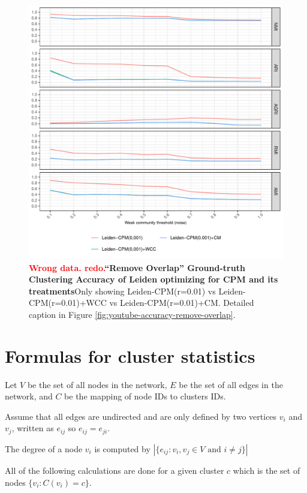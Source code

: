 \documentclass[aps,pre,superscriptaddress]{revtex4}
\begin{document}
\begin{figure}[!htpb]
\centering
\includegraphics[]{figures/remove_overlap_youtube_leiden_cpm_accuracy.pdf}
\caption[]{\textbf{\textcolor{red}{Wrong data. redo.}``Remove Overlap'' Ground-truth Clustering Accuracy of Leiden optimizing for CPM and its treatments}Only showing Leiden-CPM(r=0.01) vs Leiden-CPM(r=0.01)+WCC vs Leiden-CPM(r=0.01)+CM. Detailed caption in Figure \ref{fig:youtube-accuracy-remove-overlap}.}
\label{fig:remove-overlap-leiden-cpm}
\end{figure}

\clearpage
\section{Formulas for cluster statistics}
Let $V$ be the set of all nodes in the network, $E$ be the set of all edges in the network, and $C$ be the mapping of node IDs to clusters IDs.

Assume that all edges are undirected and are only defined by two vertices $v_{i}$ and $v_{j}$, written as $e_{ij}$ so $e_{ij} = e_{ji}$.

The degree of a node $v_{i}$ is computed by $|\{e_{ij} :v_{i},v_{j} \in V \text{ and } i \neq j\}|$

All of the following calculations are done for a given cluster $c$ which is the set of nodes $\{v_{i} : C(v_{i}) = c\}$.
\end{document}
